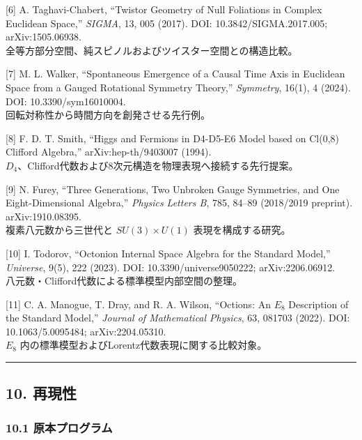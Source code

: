 \documentclass[
  a4paper,
]{ltjsarticle}
\begin{document}
{[}6{]} A. Taghavi-Chabert, ``Twistor Geometry of Null Foliations in
Complex Euclidean Space,'' \emph{SIGMA}, 13, 005 (2017). DOI:
10.3842/SIGMA.2017.005; arXiv:1505.06938.\\
全等方部分空間、純スピノルおよびツイスター空間との構造比較。

{[}7{]} M. L. Walker, ``Spontaneous Emergence of a Causal Time Axis in
Euclidean Space from a Gauged Rotational Symmetry Theory,''
\emph{Symmetry}, 16(1), 4 (2024). DOI: 10.3390/sym16010004.\\
回転対称性から時間方向を創発させる先行例。

{[}8{]} F. D. T. Smith, ``Higgs and Fermions in D4-D5-E6 Model based on
Cl(0,8) Clifford Algebra,'' arXiv:hep-th/9403007 (1994).\\
\(D_4\)、Clifford代数および8次元構造を物理表現へ接続する先行提案。

{[}9{]} N. Furey, ``Three Generations, Two Unbroken Gauge Symmetries,
and One Eight-Dimensional Algebra,'' \emph{Physics Letters B}, 785,
84--89 (2018/2019 preprint). arXiv:1910.08395.\\
複素八元数から三世代と \(SU(3)\times U(1)\) 表現を構成する研究。

{[}10{]} I. Todorov, ``Octonion Internal Space Algebra for the Standard
Model,'' \emph{Universe}, 9(5), 222 (2023). DOI:
10.3390/universe9050222; arXiv:2206.06912.\\
八元数・Clifford代数による標準模型内部空間の整理。

{[}11{]} C. A. Manogue, T. Dray, and R. A. Wilson, ``Octions: An \(E_8\)
Description of the Standard Model,'' \emph{Journal of Mathematical
Physics}, 63, 081703 (2022). DOI: 10.1063/5.0095484; arXiv:2204.05310.\\
\(E_8\) 内の標準模型およびLorentz代数表現に関する比較対象。

\begin{center}\rule{0.5\linewidth}{0.5pt}\end{center}

\subsection{10. 再現性}\label{ux518dux73feux6027}

\subsubsection{10.1
原本プログラム}\label{ux539fux672cux30d7ux30edux30b0ux30e9ux30e0}
\end{document}
